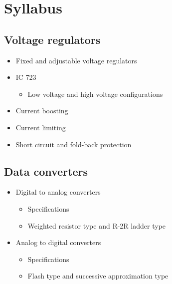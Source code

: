 \documentclass[../course]{subfiles}
\begin{document}
\section{Syllabus}

\subsection{Voltage regulators}

\begin{itemize}
    \item Fixed and adjustable voltage regulators
    \item IC 723

        \begin{itemize}
            \item Low voltage and high voltage configurations
        \end{itemize}

    \item Current boosting
    \item Current limiting
    \item Short circuit and fold-back protection
\end{itemize}

\subsection{Data converters}

\begin{itemize}
    \item Digital to analog converters

        \begin{itemize}
            \item Specifications
            \item Weighted resistor type and R-2R ladder type
        \end{itemize}

    \item Analog to digital converters

        \begin{itemize}
            \item Specifications
            \item Flash type and successive approximation type
        \end{itemize}
\end{itemize}
\end{document}
